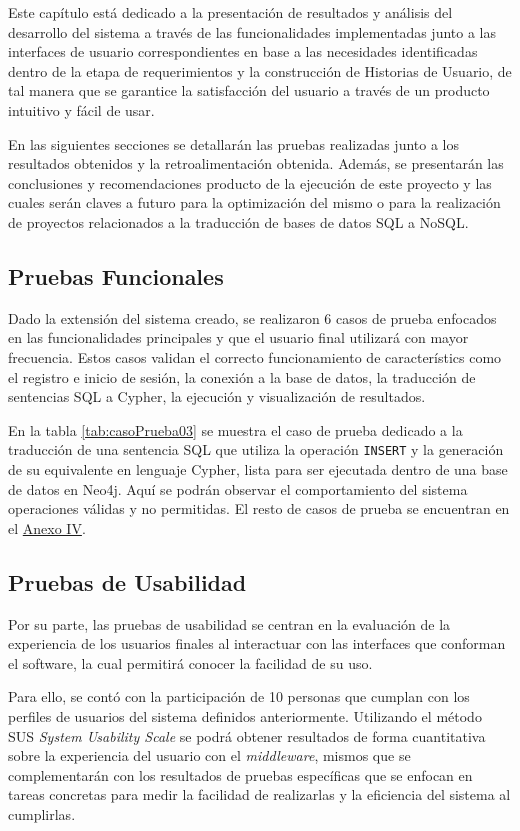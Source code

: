 Este capítulo está dedicado a la presentación de resultados y análisis del desarrollo del sistema a través de las funcionalidades implementadas junto a las interfaces de usuario correspondientes en base a las necesidades identificadas dentro de la etapa de requerimientos y la construcción de Historias de Usuario, de tal manera que se garantice la satisfacción del usuario a través de un producto intuitivo y fácil de usar.

En las siguientes secciones se detallarán las pruebas realizadas junto a los resultados obtenidos y la retroalimentación obtenida. Además, se presentarán las conclusiones y recomendaciones producto de la ejecución de este proyecto y las cuales serán claves a futuro para la optimización del mismo o para la realización de proyectos relacionados a la traducción de bases de datos SQL a NoSQL.

\subsection{Pruebas Funcionales}
Dado la extensión del sistema creado, se realizaron 6 casos de prueba enfocados en las funcionalidades principales y que el usuario final utilizará con mayor frecuencia. Estos casos validan el correcto funcionamiento de característics como el registro e inicio de sesión, la conexión a la base de datos, la traducción de sentencias SQL a Cypher, la ejecución y visualización de resultados.

En la tabla \ref{tab:casoPrueba03} se muestra el caso de prueba dedicado a la traducción de una sentencia SQL que utiliza la operación \texttt{INSERT} y la generación de su equivalente en lenguaje Cypher, lista para ser ejecutada dentro de una base de datos en Neo4j. Aquí se podrán observar el comportamiento del sistema operaciones válidas y no permitidas. El resto de casos de prueba se encuentran en el \hyperlink{anexoIV}{Anexo IV}.



\subsection{Pruebas de Usabilidad}
Por su parte, las pruebas de usabilidad se centran en la evaluación de la experiencia de los usuarios finales al interactuar con las interfaces que conforman el software, la cual permitirá conocer la facilidad de su uso.

Para ello, se contó con la participación de 10 personas que cumplan con los perfiles de usuarios del sistema definidos anteriormente. Utilizando el método SUS \textit{System Usability Scale} se podrá obtener resultados de forma cuantitativa sobre la experiencia del usuario con el \textit{middleware}, mismos que se complementarán con los resultados de pruebas específicas que se enfocan en tareas concretas para medir la facilidad de realizarlas y la eficiencia del sistema al cumplirlas.

